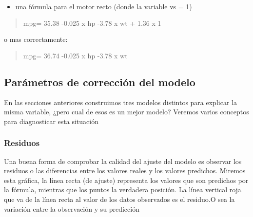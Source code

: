 \documentclass[
]{book}
\providecommand{\tightlist}{%
  \setlength{\itemsep}{0pt}\setlength{\parskip}{0pt}}
\begin{document}
\begin{itemize}
\tightlist
\item
  una fórmula para el motor recto (donde la variable vs = 1)
\end{itemize}

\begin{quote}
mpg= 35.38 -0.025 x hp -3.78 x wt + 1.36 x 1
\end{quote}

o mas correctamente:

\begin{quote}
mpg= 36.74 -0.025 x hp -3.78 x wt
\end{quote}

\hypertarget{paruxe1metros-de-correcciuxf3n-del-modelo}{%
\subsection{Parámetros de corrección del modelo}\label{paruxe1metros-de-correcciuxf3n-del-modelo}}

En las secciones anteriores construimos tres modelos distintos para explicar la misma variable, ¿pero cual de esos es un mejor modelo? Veremos varios conceptos para diagnosticar esta situación

\hypertarget{residuos}{%
\subsubsection{Residuos}\label{residuos}}

Una buena forma de comprobar la calidad del ajuste del modelo es observar los residuos o las diferencias entre los valores reales y los valores predichos. Miremos esta gráfica, la línea recta (de ajuste) representa los valores que son predichos por la fórmula, mientras que los puntos la verdadera posición. La línea vertical roja que va de la línea recta al valor de los datos observados es el residuo.O sea la variación entre la observación y su predicción
\end{document}

